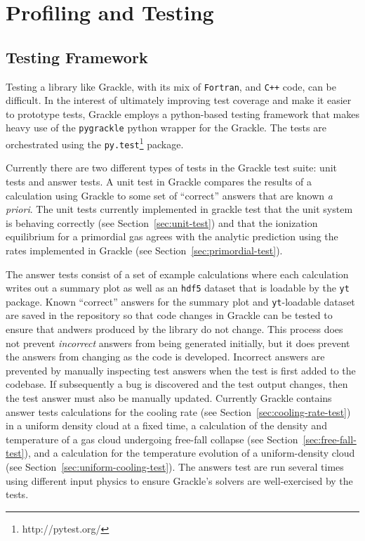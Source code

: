 \section{Profiling and Testing}
\label{sec:profiling-and-testing}



\subsection{Testing Framework}

Testing a library like Grackle, with its mix of \texttt{Fortran}, and
\texttt{C++} code, can be difficult. In the interest of ultimately improving
test coverage and make it easier to prototype tests, Grackle employs a
python-based testing framework that makes heavy use of the \texttt{pygrackle}
python wrapper for the Grackle. The tests are orchestrated using the
\texttt{py.test}\footnote{http://pytest.org/} package.

Currently there are two different types of tests in the Grackle test suite: unit
tests and answer tests. A unit test in Grackle compares the results of a
calculation using Grackle to some set of ``correct'' answers that are known
\textit{a priori}. The unit tests currently implemented in grackle test that the
unit system is behaving correctly (see Section~\ref{sec:unit-test}) and that the
ionization equilibrium for a primordial gas agrees with the analytic prediction
using the rates implemented in Grackle (see Section~\ref{sec:primordial-test}).

The answer tests consist of a set of example calculations where each calculation
writes out a summary plot as well as an \texttt{hdf5} dataset that is loadable
by the \texttt{yt} package. Known ``correct'' answers for the summary plot and
\texttt{yt}-loadable dataset are saved in the repository so that code changes in
Grackle can be tested to ensure that andwers produced by the library do not
change. This process does not prevent \textit{incorrect} answers from being
generated initially, but it does prevent the answers from changing as the code
is developed. Incorrect answers are prevented by manually inspecting test
answers when the test is first added to the codebase. If subsequently a bug is
discovered and the test output changes, then the test answer must also be
manually updated. Currently Grackle contains answer tests calculations for the
cooling rate (see Section~\ref{sec:cooling-rate-test}) in a uniform density
cloud at a fixed time, a calculation of the density and temperature of a gas
cloud undergoing free-fall collapse (see Section~\ref{sec:free-fall-test}), and
a calculation for the temperature evolution of a uniform-density cloud (see
Section~\ref{sec:uniform-cooling-test}).  The answers test are run several times
using different input physics to ensure Grackle's solvers are well-exercised by
the tests.

